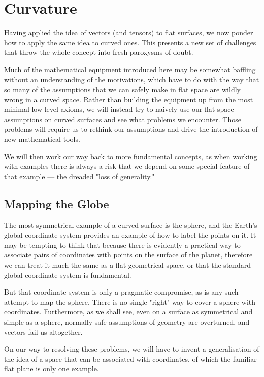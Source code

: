 \chapter{Curvature} \label{ch:curvature}

Having applied the idea of vectors (and tensors) to flat surfaces, we now ponder how to apply the same idea to curved ones. This presents a new set of challenges that throw the whole concept into fresh paroxysms of doubt.

Much of the mathematical equipment introduced here may be somewhat baffling without an understanding of the motivations, which have to do with the way that so many of the assumptions that we can safely make in flat space are wildly wrong in a curved space. Rather than building the equipment up from the most minimal low-level axioms, we will instead try to naively use our flat space assumptions on curved surfaces and see what problems we encounter. Those problems will require us to rethink our assumptions and drive the introduction of new mathematical tools.

We will then work our way back to more fundamental concepts, as when working with examples there is always a risk that we depend on some special feature of that example --- the dreaded "loss of generality."

\section{Mapping the Globe}

The most symmetrical example of a curved surface is the sphere, and the Earth's global coordinate system provides an example of how to label the points on it. It may be tempting to think that because there is evidently a practical way to associate pairs of coordinates with points on the surface of the planet, therefore we can treat it much the same as a flat geometrical space, or that the standard global coordinate system is fundamental.

But that coordinate system is only a pragmatic compromise, as is any such attempt to map the sphere. There is no single "right" way to cover a sphere with coordinates. Furthermore, as we shall see, even on a surface as symmetrical and simple as a sphere, normally safe assumptions of geometry are overturned, and vectors fail us altogether.

On our way to resolving these problems, we will have to invent a generalisation of the idea of a space that can be associated with coordinates, of which the familiar flat plane is only one example.

